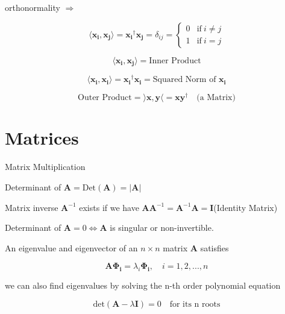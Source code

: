 \documentclass[fleqn]{article}
\begin{document}
	orthonormality $\Rightarrow$
	
	\begin{equation*}
		\langle \mathbf{x_i}, \mathbf{x_j} \rangle = \mathbf{x_i}^{\dag}\mathbf{x_j} = \delta_{ij} = \begin{cases}
			0 & \text{if}\ i \neq j \\
			1 & \text{if}\ i = j
		\end{cases}
	\end{equation*}
	
	\begin{equation*}
		\langle \mathbf{x_i}, \mathbf{x_j} \rangle = \text{Inner Product}
	\end{equation*}
		
	\begin{equation*}
		\langle \mathbf{x_i}, \mathbf{x_i} \rangle = \mathbf{x_i}^{\dag}\mathbf{x_i} = \text{Squared Norm of } \mathbf{x_i}
	\end{equation*}
	
	\begin{equation*}
		\text{Outer Product} = \rangle \mathbf{x}, \mathbf{y} \langle = \mathbf{x}\mathbf{y}^{\dag} \quad \text{(a Matrix)}
	\end{equation*}
	
	\section{Matrices}
	
	Matrix Multiplication
	
	Determinant of $\mathbf{A} = \text{Det}(\mathbf{A}) = |\mathbf{A}|$
	
	Matrix inverse $\mathbf{A}^{-1}$ exists if we have $\mathbf{A}\mathbf{A}^{-1} = \mathbf{A}^{-1}\mathbf{A} = \mathbf{I}$\quad (Identity Matrix)
	
	Determinant of $\mathbf{A} = 0 \Leftrightarrow \mathbf{A}$ is singular or non-invertible.
	
	An eigenvalue and eigenvector of an $n \times n$ matrix $\mathbf{A}$ satisfies
	
	\begin{equation*}
		\mathbf{A}\mathbf{{\Phi}_i} = {\lambda}_i\mathbf{{\Phi}_i},\quad i = 1,2,...,n
	\end{equation*}
	
	we can also find eigenvalues by solving the n-th order polynomial equation
	
	\begin{equation*}
		\text{det}(\mathbf{A} - \lambda\mathbf{I}) = 0\quad\text{for its n roots}
	\end{equation*}
	
\end{document}
